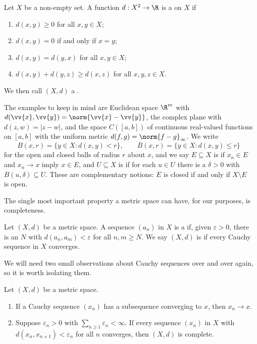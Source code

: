 \begin{definition}
	Let $X$ be a non-empty set. A function $d: X^2 \to \R$ is a  on $X$ if
	\begin{enumerate}[label=(\roman*)]
		\item $d(x,y) \geq 0$ for all $x, y \in X$;
		\item $d(x,y) = 0$ if and only if $x = y$;
		\item $d(x,y) = d(y,x)$ for all $x,y \in X$;
		\item $d(x,y) + d(y,z) \geq d(x,z)$ for all $x,y,z \in X$.
	\end{enumerate}
	We then call $(X,d)$ a .
\end{definition}

The examples to keep in mind are Euclidean space $\R^m$ with $d(\vv{x},\vv{y}) = \norm{\vv{x}-\vv{y}}$, the complex plane with $d(z,w) = |z-w|$, and the space $C([a,b])$ of continuous real-valued functions on $[a,b]$ with the uniform metric $d(f,g) = \norm{f-g}_\infty$. We write
$$B(x,r) = \{y \in X : d(x,y) < r\}, \qquad \overline{B}(x,r) = \{y \in X : d(x,y) \leq r\}$$
for the open and closed balls of radius $r$ about $x$, and we say $E \subseteq X$ is  if $x_n \in E$ and $x_n \to x$ imply $x \in E$, and $U \subseteq X$ is  if for each $u \in U$ there is a $\delta > 0$ with $B(u,\delta) \subseteq U$. These are complementary notions: $E$ is closed if and only if $X \setminus E$ is open.

The single most important property a metric space can have, for our purposes, is completeness.

\begin{definition}
	Let $(X,d)$ be a metric space. A sequence $(a_n)$ in $X$ is a  if, given $\varepsilon > 0$, there is an $N$ with $d(a_n,a_m) < \varepsilon$ for all $n,m \geq N$. We say $(X,d)$ is  if every Cauchy sequence in $X$ converges.
\end{definition}

We will need two small observations about Cauchy sequences over and over again, so it is worth isolating them.

\begin{lemma}\label{lem:cauchy-tricks}
	Let $(X,d)$ be a metric space.
	\begin{enumerate}[label=(\roman*)]
		\item If a Cauchy sequence $(x_n)$ has a subsequence converging to $x$, then $x_n \to x$.
		\item Suppose $\varepsilon_n > 0$ with $\sum_{n \geq 1} \varepsilon_n < \infty$. If every sequence $(x_n)$ in $X$ with $d(x_n, x_{n+1}) < \varepsilon_n$ for all $n$ converges, then $(X,d)$ is complete.
	\end{enumerate}
\end{lemma}

